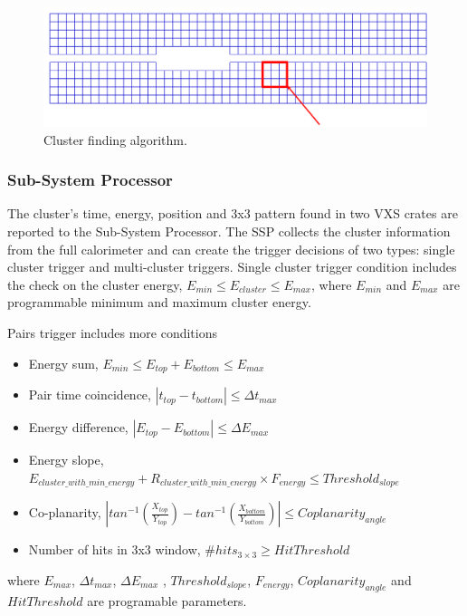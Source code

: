 \begin{figure}[h]
\includegraphics[scale=0.4]{daq_trigger/figures/hps_trigger_3x3}
\caption{\small{Cluster finding algorithm.}}
\label{fig:hps_trigger_3x3}
\end{figure}


\subsubsection{Sub-System Processor} 

The cluster's time, energy, position and 3x3 pattern found in two VXS crates are reported to the Sub-System Processor. 
The SSP collects the cluster information from the full calorimeter and can create the trigger decisions of two types:
single cluster trigger and multi-cluster triggers.
Single cluster trigger condition includes the check on the cluster energy, $E_{min}\le E_{cluster}\le E_{max}$, where $E_{min}$ and $E_{max}$ are programmable minimum and maximum cluster energy.

Pairs trigger includes more conditions
\begin{itemize}
\item Energy sum,  
$E_{min}\le E_{top}+E_{bottom}\le E_{max}$
\item Pair time coincidence, 
$|t_{top}-t_{bottom}|\le \Delta t_{max}$ 
\item Energy difference, 
$|E_{top}-E_{bottom}|\le \Delta E_{max}$ 
\item Energy slope,
$E_{cluster\_with\_min\_energy}+R_{cluster\_with\_min\_energy}\times F_{energy}\le Threshold_{slope}$
\item Co-planarity, 
$|
tan^{-1}(\frac{X_{top}}{Y_{top}})-
tan^{-1}(\frac{X_{bottom}}{Y_{bottom}}) |\le Coplanarity_{angle}$
\item Number of hits in 3x3 window, 
\#$hits_{3\times 3}\ge HitThreshold$
\end{itemize}
\noindent
where $ E_{max}$,  $\Delta t_{max}$, $ \Delta E_{max}$ , $Threshold_{slope}$, 
$F_{energy}$, $Coplanarity_{angle}$
and
$HitThreshold$ are programable parameters.



